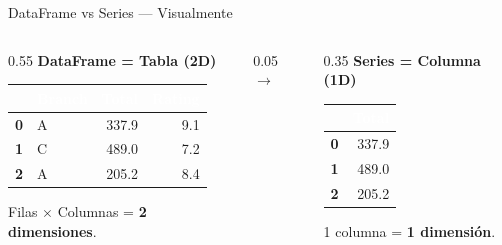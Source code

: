 \documentclass[aspectratio=169, 11pt]{beamer}
\begin{document}
\begin{frame}{DataFrame vs Series --- Visualmente}
  \vspace{-4pt}
  \begin{columns}[c]
    \begin{column}{0.55\textwidth}
      {\small\bfseries\color{arcaDark} DataFrame = Tabla (2D)}
      \vspace{4pt}

      {\scriptsize
      \begin{tabular}{@{}c|lrr@{}}
        \rowcolor{arcaRed}
        \textcolor{white}{\bfseries} &
        \textcolor{white}{\bfseries Branch} &
        \textcolor{white}{\bfseries Total} &
        \textcolor{white}{\bfseries Rating} \\
        \midrule
        \rowcolor{arcaGray} \textbf{0} & A & 337.9 & 9.1 \\
        \textbf{1} & C & 489.0 & 7.2 \\
        \rowcolor{arcaGray} \textbf{2} & A & 205.2 & 8.4 \\
      \end{tabular}
      }

      \vspace{4pt}
      {\scriptsize\color{textMuted}
        Filas $\times$ Columnas = \textbf{2 dimensiones}.}
    \end{column}

    \begin{column}{0.05\textwidth}
      \centering
      {\color{textMuted}\Large$\to$}
    \end{column}

    \begin{column}{0.35\textwidth}
      {\small\bfseries\color{codeBlue} Series = Columna (1D)}
      \vspace{4pt}

      {\scriptsize
      \begin{tabular}{@{}c|r@{}}
        \rowcolor{codeBlue}
        \textcolor{white}{\bfseries} &
        \textcolor{white}{\bfseries Total} \\
        \midrule
        \rowcolor{arcaGray} \textbf{0} & 337.9 \\
        \textbf{1} & 489.0 \\
        \rowcolor{arcaGray} \textbf{2} & 205.2 \\
      \end{tabular}
      }

      \vspace{4pt}
      {\scriptsize\color{textMuted}
        1 columna = \textbf{1 dimensión}.}
    \end{column}
  \end{columns}


\end{frame}
\end{document}
